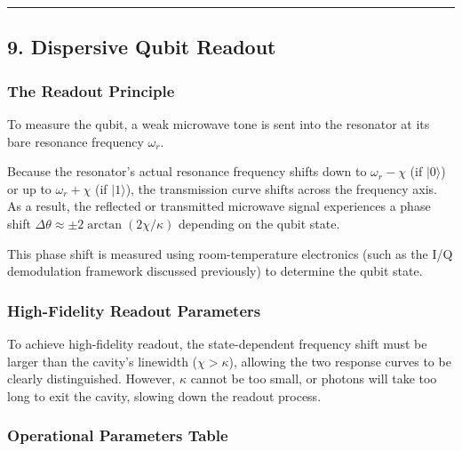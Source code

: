 \documentclass[
]{article}
\begin{document}
\begin{center}\rule{0.5\linewidth}{0.5pt}\end{center}

\subsection{9. Dispersive Qubit Readout}\label{dispersive-qubit-readout}

\subsubsection{The Readout Principle}\label{the-readout-principle}

To measure the qubit, a weak microwave tone is sent into the resonator
at its bare resonance frequency \(\omega_r\).

Because the resonator's actual resonance frequency shifts down to
\(\omega_r - \chi\) (if \(|0\rangle\)) or up to \(\omega_r + \chi\) (if
\(|1\rangle\)), the transmission curve shifts across the frequency axis.
As a result, the reflected or transmitted microwave signal experiences a
phase shift \(\Delta \theta \approx \pm 2\arctan(2\chi/\kappa)\)
depending on the qubit state.

This phase shift is measured using room-temperature electronics (such as
the I/Q demodulation framework discussed previously) to determine the
qubit state.

\subsubsection{High-Fidelity Readout
Parameters}\label{high-fidelity-readout-parameters}

To achieve high-fidelity readout, the state-dependent frequency shift
must be larger than the cavity's linewidth (\(\chi > \kappa\)), allowing
the two response curves to be clearly distinguished. However, \(\kappa\)
cannot be too small, or photons will take too long to exit the cavity,
slowing down the readout process.

\subsubsection{Operational Parameters
Table}\label{operational-parameters-table}
\end{document}
